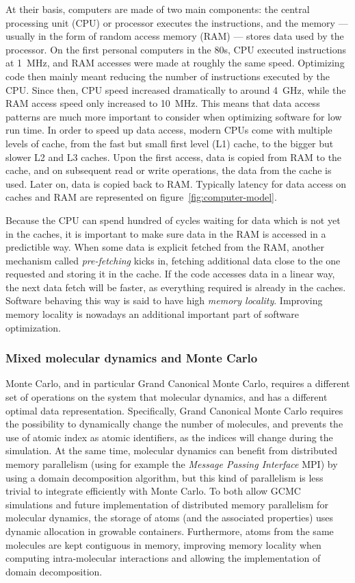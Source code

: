 \documentclass[thesis]{subfiles}
\begin{document}
At their basis, computers are made of two main components: the central
processing unit (CPU) or processor executes the instructions, and the memory ---
usually in the form of random access memory (RAM) --- stores data used by the
processor. On the first personal computers in the 80s, CPU executed instructions
at \SI{1}{MHz}, and RAM accesses were made at roughly the same speed. Optimizing
code then mainly meant reducing the number of instructions executed by the CPU.
Since then, CPU speed increased dramatically to around \SI{4}{GHz}, while the
RAM access speed only increased to \SI{10}{MHz}. This means that data access
patterns are much more important to consider when optimizing software for low
run time. In order to speed up data access, modern CPUs come with multiple
levels of cache, from the fast but small first level (L1) cache, to the bigger
but slower L2 and L3 caches. Upon the first access, data is copied from RAM to
the cache, and on subsequent read or write operations, the data from the cache
is used. Later on, data is copied back to RAM. Typically latency for data access
on caches and RAM are represented on figure~\ref{fig:computer-model}.

Because the CPU can spend hundred of cycles waiting for data which is not yet in
the caches, it is important to make sure data in the RAM is accessed in a predictible
way. When some data is explicit fetched from the RAM, another mechanism
called \emph{pre-fetching} kicks in, fetching additional data close to the one
requested and storing it in the cache. If the code accesses data in a linear
way, the next data fetch will be faster, as everything required is already in
the caches. Software behaving this way is said to have high \emph{memory
locality}. Improving memory locality is nowadays an additional important part of
software optimization.

\subsubsection{Mixed molecular dynamics and Monte Carlo}

Monte Carlo, and in particular Grand Canonical Monte Carlo, requires a different
set of operations on the system that molecular dynamics, and has a different
optimal data representation. Specifically, Grand Canonical Monte Carlo requires
the possibility to dynamically change the number of molecules, and prevents the
use of atomic index as atomic identifiers, as the indices will change during the
simulation. At the same time, molecular dynamics can benefit from distributed
memory parallelism (using for example the \emph{Message Passing Interface} MPI)
by using a domain decomposition algorithm, but this kind of parallelism is less
trivial to integrate efficiently with Monte Carlo. To both allow GCMC
simulations and future implementation of distributed memory parallelism for
molecular dynamics, the storage of atoms (and the associated properties) uses
dynamic allocation in growable containers. Furthermore, atoms from the same
molecules are kept contiguous in memory, improving memory locality when
computing intra-molecular interactions and allowing the implementation of domain
decomposition.
\end{document}

